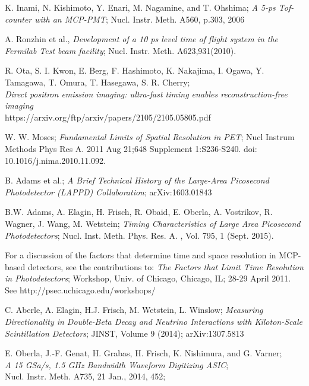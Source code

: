 \documentclass[12pt]{article}
\begin{document}
\begin{thebibliography}{99}
 K. Inami, N. Kishimoto, Y. Enari, M. Nagamine, and T.
Ohshima; {\it  A 5-ps Tof-counter
  with an MCP-PMT}; Nucl. Instr. Meth. A560, p.303, 2006

 A. Ronzhin et al., {\it Development of a 10 ps level time of flight
system in the Fermilab Test beam facility}; Nucl. Instr. Meth.
A623,931(2010).

 R. Ota, S. I. Kwon, E. Berg, F. Hashimoto, K. Nakajima, I.
Ogawa, Y. Tamagawa, T. Omura, T. Hasegawa, S. R. Cherry;\\
{\it Direct positron emission imaging: ultra-fast timing enables reconstruction-free imaging}\\
https://arxiv.org/ftp/arxiv/papers/2105/2105.05805.pdf

 W. W. Moses; {\it Fundamental Limits of
  Spatial Resolution in PET}; Nucl Instrum Methods Phys Res A. 2011 Aug
  21;648 Supplement 1:S236-S240. doi: 10.1016/j.nima.2010.11.092.

 B. Adams et al.;
{\it A Brief Technical History of the Large-Area Picosecond
Photodetector (LAPPD) Collaboration}; arXiv:1603.01843

B.W. Adams, A. Elagin, H. Frisch, R. Obaid, E. Oberla, A. Vostrikov, R.
Wagner, J. Wang, M. Wetstein; {\it  Timing Characteristics of Large
Area Picosecond Photodetectors}; Nucl. Inst. Meth. Phys. Res. A. , Vol.
795, 1 (Sept. 2015).

  For a discussion of the factors that
determine time and space resolution in MCP-based detectors, see the
contributions to: {\it The Factors that Limit Time Resolution in
Photodetectors}; Workshop, Univ. of Chicago, Chicago, IL; 28-29 April
2011. See http://psec.uchicago.edu/workshops/

C. Aberle, A. Elagin, H.J. Frisch, M. Wetstein, L. Winslow;  {\it
Measuring Directionality in Double-Beta Decay and Neutrino Interactions
with Kiloton-Scale Scintillation Detectors}; JINST, Volume 9 (2014);
arXiv:1307.5813

E. Oberla, J.-F. Genat, H. Grabas, H. Frisch, K. Nishimura, and G. Varner;\\
 {\it A 15 GSa/s, 1.5 GHz Bandwidth Waveform Digitizing ASIC};\\
 Nucl. Instr. Meth. A735, 21 Jan., 2014, 452;


\end{thebibliography}
\end{document}
